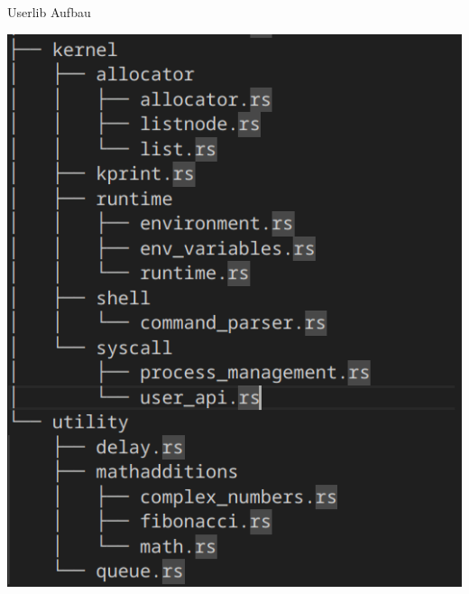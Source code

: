 \begin{frame}{Userlib Aufbau}
\begin{minipage}[t]{0.48\textwidth}
        \includegraphics[height=0.7\textheight]{fig/Code Screens/Tree 2.png} 
    \end{minipage}
\end{frame}



